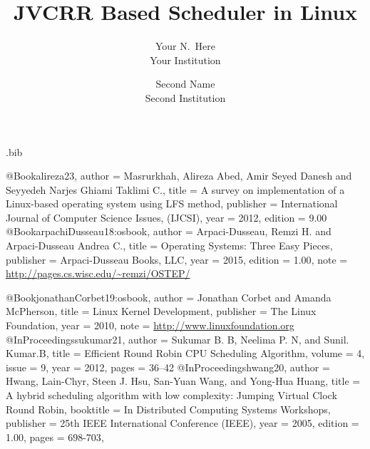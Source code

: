 \begin{filecontents}{\jobname.bib}

@Book{alireza23,
  author =       {Masrurkhah, Alireza Abed, Amir Seyed Danesh and Seyyedeh Narjes Ghiami Taklimi C.},
  title =        {A survey on implementation of a Linux-based operating system using LFS method},
  publisher =    {International Journal of Computer Science Issues, (IJCSI)},
  year =         2012,
  edition =      {9.00}
}
@Book{arpachiDusseau18:osbook,
  author =       {Arpaci-Dusseau, Remzi H. and Arpaci-Dusseau Andrea C.},
  title =        {Operating Systems: Three Easy Pieces},
  publisher =    {Arpaci-Dusseau Books, LLC},
  year =         2015,
  edition =      {1.00},
  note =         {\url{http://pages.cs.wisc.edu/~remzi/OSTEP/}}
}

@Book{jonathanCorbet19:osbook,
  author =       {Jonathan Corbet and Amanda McPherson},
  title =        {Linux Kernel Development},
  publisher =    {The Linux Foundation},
  year =         2010,
  note =         {\url{http://www.linuxfoundation.org}}
}
@InProceedings{sukumar21,
  author =       {Sukumar B. B, Neelima P. N, and Sunil. Kumar.B},
  title =        {Efficient Round Robin CPU Scheduling Algorithm},
  volume = 4,
  issue = 9,
  year =         2012,
  pages =        {36--42}
  }
@InProceedings{hwang20,
  author =       {Hwang, Lain-Chyr, Steen J. Hsu, San-Yuan Wang, and Yong-Hua Huang},
  title =        {A hybrid scheduling algorithm with low complexity: Jumping Virtual Clock Round Robin},
  booktitle =    {In Distributed Computing Systems Workshops},  
  publisher =    {25th IEEE International Conference (IEEE)},
  year =         2005,
  edition =      {1.00},
  pages =        {698-703},
}
  
\end{filecontents}



\date{}

\title{\Large \bf JVCRR Based Scheduler in Linux\\}

\author{
{\rm Your N.\ Here}\\
Your Institution
\and
{\rm Second Name}\\
Second Institution
} %


